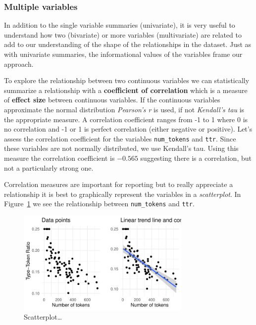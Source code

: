 \documentclass[
  letterpaper,
]{latex/krantz}
\begin{document}
\hypertarget{multiple-variables}{%
\subsubsection{Multiple variables}\label{multiple-variables}}

In addition to the single variable summaries (univariate), it is very
useful to understand how two (bivariate) or more variables
(multivariate) are related to add to our understanding of the shape of
the relationships in the dataset. Just as with univariate summaries, the
informational values of the variables frame our approach.

To explore the relationship between two continuous variables we can
statistically summarize a relationship with a \textbf{coefficient of
correlation} which is a measure of \textbf{effect size} between
continuous variables. If the continuous variables approximate the normal
distribution \emph{Pearson's r} is used, if not \emph{Kendall's tau} is
the appropriate measure. A correlation coefficient ranges from -1 to 1
where 0 is no correlation and -1 or 1 is perfect correlation (either
negative or positive). Let's assess the correlation coefficient for the
variables \texttt{num\_tokens} and \texttt{ttr}. Since these variables
are not normally distributed, we use Kendall's tau. Using this measure
the correlation coefficient is \(-0.565\) suggesting there is a
correlation, but not a particularly strong one.

Correlation measures are important for reporting but to really
appreciate a relationship it is best to graphically represent the
variables in a \emph{scatterplot}. In
Figure~\ref{fig-summaries-bivariate-scatterplot-belc} we see the
relationship between \texttt{num\_tokens} and \texttt{ttr}.

\begin{figure}[h]

{\centering \includegraphics[width=0.75\textwidth,height=\textheight]{approaching-analysis_files/figure-pdf/fig-summaries-bivariate-scatterplot-belc-1.pdf}

}

\caption{\label{fig-summaries-bivariate-scatterplot-belc}Scatterplot\ldots{}}

\end{figure}
\end{document}

